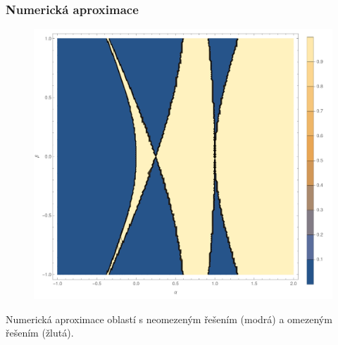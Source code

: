 \documentclass{beamer}
\begin{document}
\begin{frame}
\frametitle{Numerická aproximace}

\begin{figure}
\includegraphics[scale=0.34]{Figure2_num.pdf}
\end{figure}
\begin{center}
\begin{tiny}
Numerická aproximace oblastí s neomezeným řešením (modrá) a omezeným řešením (žlutá).
\end{tiny}
\end{center}


\end{frame}
\end{document}
